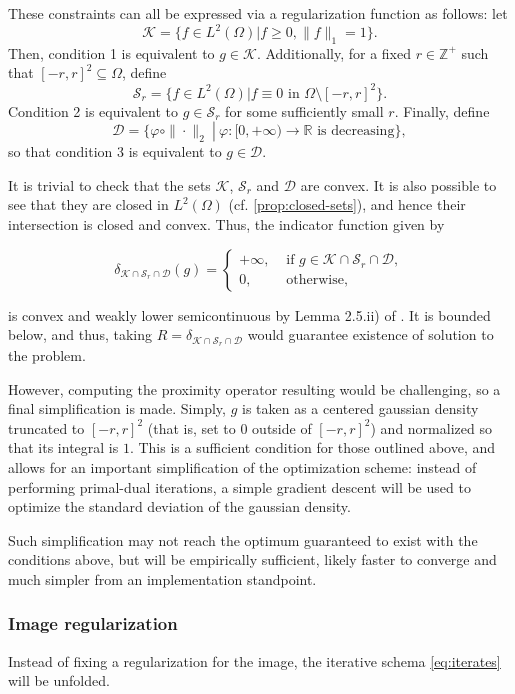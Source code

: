 \documentclass[twocolumn,twoside,a4paper,10pt]{IEEEtran}
\begin{document}
These constraints can all be expressed via a regularization function as follows: let \[\mathcal{K}=\{f\in L^2(\Omega) | f\geq 0, \|f\|_{1}=1\}.\] Then, condition 1 is equivalent to \(g\in \mathcal{K}\). Additionally, for a fixed \(r\in\mathbb{Z}^+\) such that \([-r, r]^2\subseteq\Omega\), define \[\mathcal{S}_r = \{f\in L^2(\Omega) | f\equiv 0 \text{~in~} \Omega\setminus [-r, r]^2\}.\] Condition 2 is equivalent to \(g\in \mathcal{S}_r\) for some sufficiently small \(r\). Finally, define \[\mathcal{D}=\{\left.\varphi\circ\|\cdot\|_{2} ~\right|~ \varphi\colon[0,+\infty)\to \mathbb{R} \text{ is decreasing}\},\] so that condition 3 is equivalent to \(g\in \mathcal{D}\).

It is trivial to check that the sets \(\mathcal{K}\), \(\mathcal{S}_r\) and \(\mathcal{D}\) are convex. It is also possible to see that they are closed in \(L^2(\Omega)\) (cf. \cref{prop:closed-sets}), and hence their intersection is closed and convex. Thus, the indicator function given by

\[\delta_{\mathcal{K}\cap \mathcal{S}_r\cap \mathcal{D}}(g) = \left\{\begin{array}{rl}
  +\infty ,& \text{ if }g\in\mathcal{K}\cap \mathcal{S}_r\cap \mathcal{D},\\
  0       ,& \text{ otherwise,}
\end{array}\right.\]

is convex and weakly lower semicontinuous by Lemma 2.5.ii) of \cite{clason2024introductionnonsmoothanalysisoptimization}. It is bounded below, and thus, taking \(R=\delta_{\mathcal{K}\cap \mathcal{S}_r\cap \mathcal{D}}\) would guarantee existence of solution to the problem.

However, computing the proximity operator resulting would be challenging, so a final simplification is made. Simply, \(g\) is taken as a centered gaussian density truncated to \([-r,r]^2\) (that is, set to 0 outside of \([-r, r]^2\)) and normalized so that its integral is \(1\). This is a sufficient condition for those outlined above, and allows for an important simplification of the optimization scheme: instead of performing primal-dual iterations, a simple gradient descent will be used to optimize the standard deviation of the gaussian density.

Such simplification may not reach the optimum guaranteed to exist with the conditions above, but will be empirically sufficient, likely faster to converge and much simpler from an implementation standpoint.
\subsubsection{Image regularization} Instead of fixing a regularization for the image, the iterative schema \cref{eq:iterates} will be unfolded.
\end{document}
